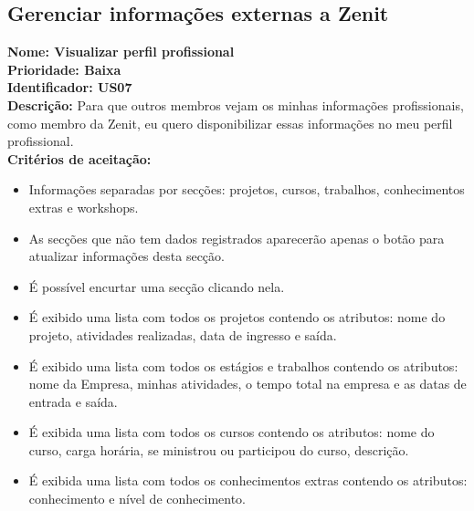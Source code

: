\begin{anexosenv}
\subsection{Gerenciar informações externas a Zenit}

\indent \textbf{Nome: Visualizar perfil profissional\\
    \indent Prioridade: Baixa\\
    \indent Identificador: US07\\
    \indent Descrição: } Para que outros membros vejam os minhas informações profissionais, como membro da Zenit, eu quero disponibilizar essas informações no meu perfil profissional.\\
\indent \textbf{Critérios de aceitação:}
\begin{itemize}
    \item Informações separadas por secções: projetos, cursos, trabalhos, conhecimentos extras e workshops.
    \item   As secções que não tem dados registrados aparecerão apenas o botão para atualizar informações desta secção.
    \item É possível encurtar uma secção clicando nela.
    \item É exibido uma lista com todos os projetos contendo os atributos: nome do projeto, atividades realizadas, data de ingresso e saída.
    \item É exibido uma lista com todos os estágios e trabalhos contendo os atributos: nome da Empresa, minhas atividades, o tempo total na empresa e as datas de entrada e saída.
    \item É exibida uma lista com todos os cursos contendo os atributos: nome do curso, carga horária, se ministrou ou participou do curso, descrição.
    \item É exibida uma lista com todos os conhecimentos extras contendo os atributos: conhecimento e nível de conhecimento.
\end{itemize}


\end{anexosenv}
